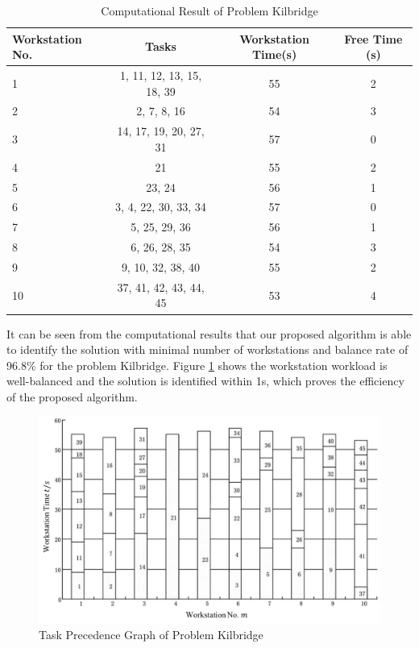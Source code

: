 \begin{table}[h!]
	\begin{center}
		\caption{Computational Result of Problem Kilbridge}
		\label{tab:tab1}
		\begin{tabular}{l|c|c|c}
			\hline
			\textbf{Workstation No.} & \textbf{Tasks} & \textbf{Workstation Time(s)} & \textbf{Free Time (s)}\\
			\hline
			1 & 1, 11, 12, 13, 15, 18, 39 & 55 & 2\\
			\hline
			2 & 2, 7, 8, 16 & 54 & 3\\
			\hline
			3 & 14, 17, 19, 20, 27, 31 & 57 & 0\\
			\hline
			4 & 21 & 55 & 2 \\
			\hline
			5 & 23, 24 & 56 & 1 \\
			\hline
			6 & 3, 4, 22, 30, 33, 34 & 57 & 0 \\
			\hline
			7 & 5, 25, 29, 36 & 56 & 1\\
			\hline
			8 & 6, 26, 28, 35 & 54 & 3 \\
			\hline
			9 & 9, 10, 32, 38, 40 & 55 & 2\\
			\hline
			10 & 37, 41, 42, 43, 44, 45 & 53 & 4\\
			\hline
		\end{tabular}
	\end{center}
\end{table}

It can be seen from the computational results that our proposed algorithm is able to identify the solution with minimal number of workstations and balance rate of 96.8\% for the problem Kilbridge.
Figure \ref{fig:fig2} shows the workstation workload is well-balanced and the solution is identified within 1s, which proves the efficiency of the proposed algorithm.



\begin{figure}[h!]
	\begin{center}
		\includegraphics[width=0.8\linewidth]{sections/figure2.png}
		\caption{Task Precedence Graph of Problem Kilbridge}
		\label{fig:fig2}
	\end{center}
\end{figure}


